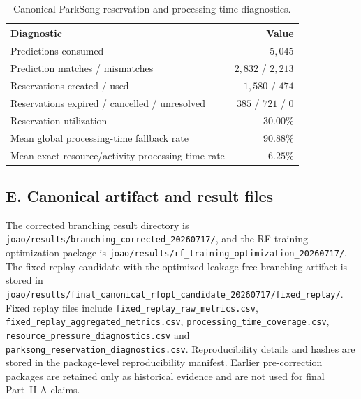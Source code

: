 \begin{table}[H]
    \caption{Canonical ParkSong reservation and processing-time diagnostics.}
    \centering
    \scriptsize
    \begin{tabular}{lr}
        \toprule
        \textbf{Diagnostic} & \textbf{Value} \\
        \midrule
        Predictions consumed & $5{,}045$ \\
        Prediction matches / mismatches & $2{,}832$ / $2{,}213$ \\
        Reservations created / used & $1{,}580$ / $474$ \\
        Reservations expired / cancelled / unresolved & $385$ / $721$ / $0$ \\
        Reservation utilization & $30.00\%$ \\
        Mean global processing-time fallback rate & $90.88\%$ \\
        Mean exact resource/activity processing-time rate & $6.25\%$ \\
        \bottomrule
    \end{tabular}
\end{table}

\subsection*{E. Canonical artifact and result files}
The corrected branching result directory is
\texttt{joao/results/branching\_corrected\_20260717/}, and the RF training
optimization package is
\texttt{joao/results/rf\_training\_optimization\_20260717/}. The fixed replay
candidate with the optimized leakage-free branching artifact is stored in
\texttt{joao/results/final\_canonical\_rfopt\_candidate\_20260717/fixed\_replay/}. Fixed replay files include
\texttt{fixed\_replay\_raw\_metrics.csv},
\texttt{fixed\_replay\_aggregated\_metrics.csv},
\texttt{processing\_time\_coverage.csv},
\texttt{resource\_pressure\_diagnostics.csv} and
\texttt{parksong\_reservation\_diagnostics.csv}. Reproducibility details and
hashes are stored in the package-level reproducibility manifest. Earlier
pre-correction packages are retained only as historical evidence and are not
used for final Part~II-A claims.
